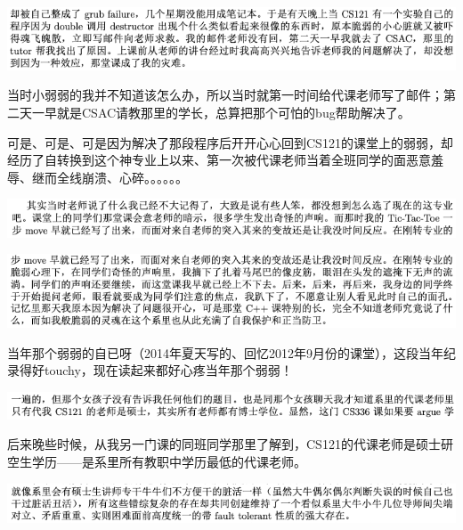 \documentclass[9pt, b5paper]{article}
\begin{document}
\begin{center}
\includegraphics[width=.9\linewidth]{./pic/backups_plans_20210424_203454.png}
\end{center}

当时小弱弱的我并不知道该怎么办，所以当时就第一时间给代课老师写了邮件；第二天一早就是CSAC请教那里的学长，总算把那个可怕的bug帮助解决了。

可是、可是、可是因为解决了那段程序后开开心心回到CS121的课堂上的弱弱，却经历了自转换到这个神专业上以来、第一次被代课老师当着全班同学的面恶意羞辱、继而全线崩溃、心碎。。。。。。

\begin{center}
\includegraphics[width=.9\linewidth]{./pic/backups_plans_20210424_203548.png}
\end{center}

\begin{center}
\includegraphics[width=.9\linewidth]{./pic/backups_plans_20210424_203612.png}
\end{center}

当年那个弱弱的自已呀（2014年夏天写的、回忆2012年9月份的课堂），这段当年纪录得好touchy，现在读起来都好心疼当年那个弱弱！

\begin{center}
\includegraphics[width=.9\linewidth]{./pic/backups_plans_20210424_210229.png}
\end{center}

后来晚些时候，从我另一门课的同班同学那里了解到，CS121的代课老师是硕士研空生学历——是系里所有教职中学历最低的代课老师。

\begin{center}
\includegraphics[width=.9\linewidth]{./pic/backups_plans_20210424_155915.png}
\end{center}
\end{document}
